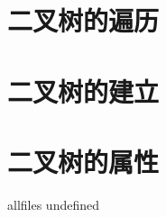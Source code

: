 \documentclass{article}
\begin{document}
\begin{CJK}{UTF8}{gbsn}     %

\else
	
\section{二叉树的遍历}

\newpage
\section{二叉树的建立}

\newpage
\section{二叉树的属性}

\newpage

\fi

\ifx allfiles undefined
\end{CJK}
\end{document}
